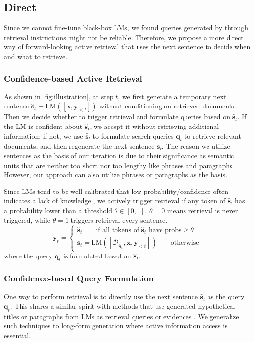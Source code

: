 \subsection{Direct \ours}
Since we cannot fine-tune black-box LMs, we found queries generated by \oursr through retrieval instructions might not be reliable.
Therefore, we propose a more direct way of forward-looking active retrieval that uses the next sentence to decide when and what to retrieve.

\subsubsection{Confidence-based Active Retrieval}
As shown in \autoref{fig:illustration}, at step $t$, we first generate a temporary next sentence $\hat{\bm{s}}_t=\text{LM}([\bm{x}, \bm{y}_{<t}])$ without conditioning on retrieved documents.
Then we decide whether to trigger retrieval and formulate queries based on $\hat{\bm{s}}_t$.
If the LM is confident about $\hat{\bm{s}}_t$, we accept it without retrieving additional information; if not, we use $\hat{\bm{s}}_t$ to formulate search queries $\bm{q}_t$ to retrieve relevant documents, and then regenerate the next sentence $\bm{s}_t$.
The reason we utilize sentences as the basis of our iteration is due to their significance as semantic units that are neither too short nor too lengthy like phrases and paragraphs.
However, our approach can also utilize phrases or paragraphs as the basis.

Since LMs tend to be well-calibrated that low probability/confidence often indicates a lack of knowledge \cite{when-jiang-2021,mostlyknow-kadavath-2022,varshney-oqa-2022}, we actively trigger retrieval if any token of $\hat{\bm{s}}_t$ has a probability lower than a threshold $\theta \in [0, 1]$.
$\theta=0$ means retrieval is never triggered, while $\theta=1$ triggers retrieval every sentence.
\begin{equation*}
\bm{y}_t = 
\begin{cases}
\hat{\bm{s}}_t \quad\quad \text{if all tokens of } \hat{\bm{s}}_t \text{ have probs} \ge \theta \\
\bm{s}_t=\text{LM}([\mathcal{D}_{\bm{q}_t}, \bm{x}, \bm{y}_{<t}]) \quad\quad \text{otherwise}
\end{cases}
\end{equation*}
where the query $\bm{q}_t$ is formulated based on $\hat{\bm{s}}_t$.

\subsubsection{Confidence-based Query Formulation}
One way to perform retrieval is to directly use the next sentence $\hat{\bm{s}}_t$ as the query $\bm{q}_t$.
This shares a similar spirit with methods that use generated hypothetical titles or paragraphs from LMs as retrieval queries or evidences \cite{hyde-gao-2022,recitation-sun-2022,genorret-yu-2022,gar-mao-2021}.
We generalize such techniques to long-form generation where active information access is essential.

